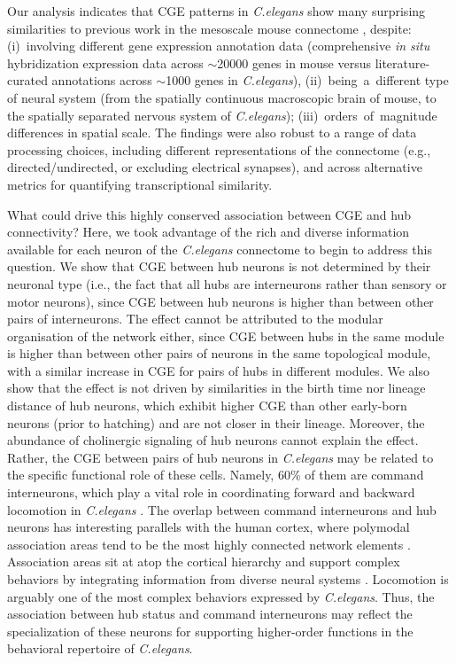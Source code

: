 {Our analysis indicates that CGE patterns in \emph{C.elegans} show many surprising similarities to previous work in the mesoscale mouse connectome \citep{Fulcher2016}, despite:
\mbox{(i) involving} different gene expression annotation data (comprehensive \emph{in situ} hybridization expression data across $\sim$\num{20000} genes in mouse versus literature-curated annotations across $\sim$\num{1000} genes in \emph{C.elegans}),
\mbox{(ii) being a }different type of neural system (from the spatially continuous macroscopic brain of mouse, to the spatially separated nervous system of \emph{C.elegans});
\mbox{(iii) orders of }magnitude differences in spatial scale.
The findings were also robust to a range of data processing choices, including different representations of the connectome (e.g., directed/undirected, or excluding electrical synapses), and across alternative metrics for quantifying transcriptional similarity.

What could drive this highly conserved association between CGE and hub connectivity?
Here, we took advantage of the rich and diverse information available for each neuron of the \emph{C.elegans} connectome to begin to address this question.
We show that CGE between hub neurons is not determined by their neuronal type (i.e., the fact that all hubs are interneurons rather than sensory or motor neurons), since CGE between hub neurons is higher than between other pairs of interneurons.
The effect cannot be attributed to the modular organisation of the network either, since CGE between hubs in the same module is higher than between other pairs of neurons in the same topological module, with a similar increase in CGE for pairs of hubs in different modules.
We also show that the effect is not driven by similarities in the birth time nor lineage distance of hub neurons, which exhibit higher CGE than other early-born neurons (prior to hatching) and are not closer in their lineage.
Moreover, the abundance of cholinergic signaling of hub neurons cannot explain the effect.
Rather, the CGE between pairs of hub neurons in \textit{C.elegans} may be related to the specific functional role of these cells.
Namely, 60\% of them are command interneurons, which play a vital role in coordinating forward and backward locomotion in \textit{C.elegans} \citep{Kim2016}.
The overlap between command interneurons and hub neurons has interesting parallels with the human cortex, where polymodal association areas tend to be the most highly connected network elements \mbox{\citep{VandenHeuvel2016}}.
Association areas sit at atop the cortical hierarchy and support complex behaviors by integrating information from diverse neural systems \citep{Mesulam1998}.
Locomotion is arguably one of the most complex behaviors expressed by \emph{C.elegans}.
Thus, the association between hub status and command interneurons may reflect the specialization of these neurons for supporting higher-order functions in the behavioral repertoire of \emph{C.elegans}.

}
